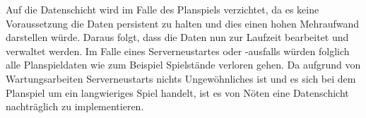  Auf die Datenschicht wird im Falle des Planspiels verzichtet, da es keine Voraussetzung die Daten persistent zu halten und dies einen hohen Mehraufwand darstellen würde. Daraus folgt, dass die Daten nun zur Laufzeit bearbeitet und verwaltet werden.
 Im Falle eines Serverneustartes oder -ausfalls würden folglich alle Planspieldaten wie zum Beispiel Spielstände verloren gehen. Da aufgrund von Wartungsarbeiten Serverneustarts nichts Ungewöhnliches ist und es sich bei dem Planspiel um ein langwieriges Spiel handelt, ist es von Nöten eine Datenschicht nachträglich zu implementieren. 
 
